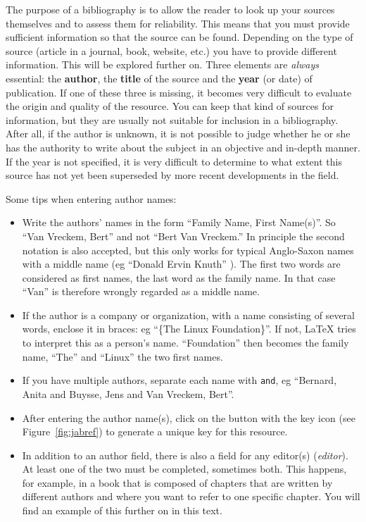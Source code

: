 The purpose of a bibliography is to allow the reader to look up your sources themselves and to assess them for reliability. This means that you must provide sufficient information so that the source can be found. Depending on the type of source (article in a journal, book, website, etc.) you have to provide different information. This will be explored further on. Three elements are \emph{always} essential: the \textbf{author}, the \textbf{title} of the source and the \textbf{year} (or date) of publication. If one of these three is missing, it becomes very difficult to evaluate the origin and quality of the resource. You can keep that kind of sources for information, but they are usually not suitable for inclusion in a bibliography. After all, if the author is unknown, it is not possible to judge whether he or she has the authority to write about the subject in an objective and in-depth manner. If the year is not specified, it is very difficult to determine to what extent this source has not yet been superseded by more recent developments in the field.

Some tips when entering author names:

\begin{itemize}
    
    \item Write the authors' names in the form ``Family Name, First Name(s)''. So ``Van Vreckem, Bert'' and not ``Bert Van Vreckem.'' In principle the second notation is also accepted, but this only works for typical Anglo-Saxon names with a middle name (eg ``Donald Ervin Knuth'' ). The first two words are considered as first names, the last word as the family name. In that case ``Van'' is therefore wrongly regarded as a middle name.
    \item If the author is a company or organization, with a name consisting of several words, enclose it in braces: eg ``\{The Linux Foundation\}''. If not, {\LaTeX} tries to interpret this as a person's name. ``Foundation'' then becomes the family name, ``The'' and ``Linux'' the two first names.
    \item If you have multiple authors, separate each name with \texttt{and}, eg ``Bernard, Anita and Buysse, Jens and Van Vreckem, Bert''.
    \item After entering the author name(s), click on the button with the key icon (see Figure~\ref{fig:jabref}) to generate a unique key for this resource.
    \item In addition to an author field, there is also a field for any editor(s) (\emph{editor}). At least one of the two must be completed, sometimes both. This happens, for example, in a book that is composed of chapters that are written by different authors and where you want to refer to one specific chapter. You will find an example of this further on in this text.   
\end{itemize}

